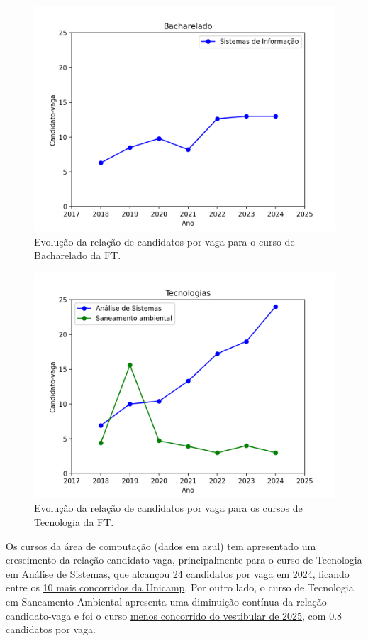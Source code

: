 \documentclass[
  letterpaper,
  DIV=11,
  numbers=noendperiod]{scrreprt}
\begin{document}
\begin{figure}[H]

{\centering \includegraphics[width=0.6\linewidth,height=\textheight,keepaspectratio]{motivacao/../dados/grafico-candidato-vaga-bacharelado.png}

}

\caption{Evolução da relação de candidatos por vaga para o curso de
Bacharelado da FT.}

\end{figure}%

\begin{figure}[H]

{\centering \includegraphics[width=0.6\linewidth,height=\textheight,keepaspectratio]{motivacao/../dados/grafico-candidato-vaga-tecnologia.png}

}

\caption{Evolução da relação de candidatos por vaga para os cursos de
Tecnologia da FT.}

\end{figure}%

Os cursos da área de computação (dados em azul) tem apresentado um
crescimento da relação candidato-vaga, principalmente para o curso de
Tecnologia em Análise de Sistemas, que alcançou 24 candidatos por vaga
em 2024, ficando entre os
\href{https://unicamp.br/noticias/2024/09/20/comvest-registra-63-mil-estudantes-inscritos-no-vestibular-2025/}{10
mais concorridos da Unicamp}. Por outro lado, o curso de Tecnologia em
Saneamento Ambiental apresenta uma diminuição contínua da relação
candidato-vaga e foi o curso
\href{https://educacao.uol.com.br/noticias/2025/02/10/vagas-sobrando-veja-os-cursos-menos-concorridos-na-usp-unicamp-e-ufrj.htm}{menos
concorrido do vestibular de 2025}, com 0.8 candidatos por vaga.
\end{document}
